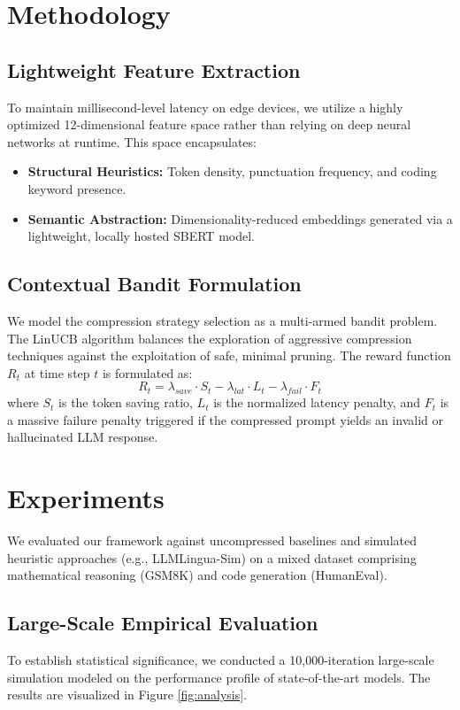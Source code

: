 \documentclass{article}
\begin{document}
\section{Methodology}

\subsection{Lightweight Feature Extraction}
To maintain millisecond-level latency on edge devices, we utilize a highly optimized 12-dimensional feature space rather than relying on deep neural networks at runtime. This space encapsulates:
\begin{itemize}
    \item \textbf{Structural Heuristics:} Token density, punctuation frequency, and coding keyword presence.
    \item \textbf{Semantic Abstraction:} Dimensionality-reduced embeddings generated via a lightweight, locally hosted SBERT model.
\end{itemize}

\subsection{Contextual Bandit Formulation}
We model the compression strategy selection as a multi-armed bandit problem. The LinUCB algorithm balances the exploration of aggressive compression techniques against the exploitation of safe, minimal pruning. The reward function $R_t$ at time step $t$ is formulated as:
\begin{equation}
    R_t = \lambda_{save} \cdot S_t - \lambda_{lat} \cdot L_t - \lambda_{fail} \cdot F_t
\end{equation}
where $S_t$ is the token saving ratio, $L_t$ is the normalized latency penalty, and $F_t$ is a massive failure penalty triggered if the compressed prompt yields an invalid or hallucinated LLM response.

\section{Experiments}
We evaluated our framework against uncompressed baselines and simulated heuristic approaches (e.g., LLMLingua-Sim) on a mixed dataset comprising mathematical reasoning (GSM8K) and code generation (HumanEval).

\subsection{Large-Scale Empirical Evaluation}
To establish statistical significance, we conducted a 10,000-iteration large-scale simulation modeled on the performance profile of state-of-the-art models. The results are visualized in Figure \ref{fig:analysis}.
\end{document}

